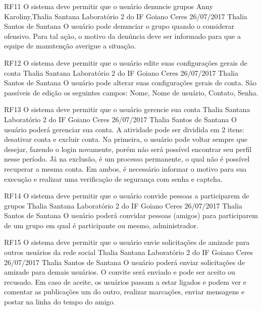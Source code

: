  \requisitoFuncional
 {RF11}
 {O sistema deve permitir que o usuário denuncie grupos}
 {Anny Karoliny,Thalia Santana}
 {Laboratório 2 do IF Goiano Ceres}
 {26/07/2017}
 {Thalia Santos de Santana}
 {O usuário pode denunciar o grupo quando o considerar ofensivo. Para tal ação, o motivo da denúncia deve ser informado para que a equipe de manutenção averigue a situação.
 }
 
 \requisitoFuncional
 {RF12}
 {O sistema deve permitir que o usuário edite suas configurações gerais de conta}
 {Thalia Santana}
 {Laboratório 2 do IF Goiano Ceres}
 {26/07/2017}
 {Thalia Santos de Santana}
 {O usuário pode alterar suas configurações gerais de conta. São passíveis de edição os seguintes campos: Nome, Nome de usuário, Contato,  Senha.
 }
 
 \requisitoFuncional
 {RF13}
 {O sistema deve permitir que o usuário gerencie sua conta}
 {Thalia Santana}
 {Laboratório 2 do IF Goiano Ceres}
 {26/07/2017}
 {Thalia Santos de Santana}
 {O usuário poderá gerenciar sua conta. A atividade pode ser dividida em 2 itens: desativar conta e excluir conta. Na primeira, o usuário pode voltar sempre que desejar, fazendo o login novamente, porém não será possível encontrar seu perfil nesse período. Já na exclusão, é um processo permanente,  o qual não é possível recuperar a mesma conta. Em ambos, é necessário informar o motivo para sua execução e realizar uma verificação de segurança com  senha e captcha.  
 }
 
 \requisitoFuncional
 {RF14}
 {O sistema deve permitir que o usuário convide pessoas a participarem de grupos}
 {Thalia Santana}
 {Laboratório 2 do IF Goiano Ceres}
 {26/07/2017}
 {Thalia Santos de Santana}
 {O usuário poderá convidar pessoas (amigos) para participarem de um grupo em qual é participante ou mesmo, administrador.
 }
 
 \requisitoFuncional
 {RF15}
 {O sistema deve permitir que o usuário envie solicitações de amizade para outros usuários da rede social}
 {Thalia Santana}
 {Laboratório 2 do IF Goiano Ceres}
 {26/07/2017}
 {Thalia Santos de Santana}
 {O usuário poderá enviar solicitações de amizade para demais usuários. O convite será enviado e pode ser aceito ou recusado.  Em caso de aceite, os usuários passam a estar ligados e podem ver e comentar as publicações um do outro, realizar marcações, enviar mensagens e postar na linha do tempo do amigo.
 }
 

